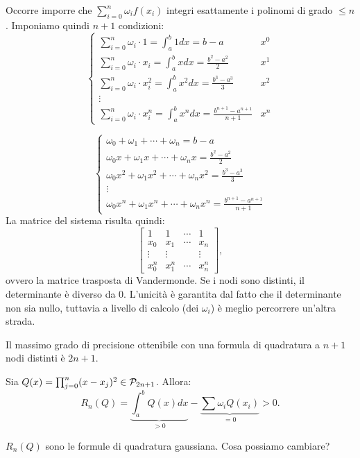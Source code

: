 \begin{dimo}
Occorre imporre che $ \sum_{i=0}^n\omega_if(x_i)$ integri esattamente i 
polinomi di grado $\leq n$. Imponiamo quindi $n+1$ condizioni:
\[\left\{
\begin{array}{lr}
\sum_{i=0}^n\omega_i\cdot 1 = \int_a^b 1dx = b-a& x^{0} \\
\sum_{i=0}^n\omega_i\cdot x_i = \int_a^b xdx = \frac{b^2-a^2}{2}& x^{1} \\
\sum_{i=0}^n\omega_i\cdot x_i^2 = \int_a^b x^2dx = \frac{b^3-a^3}{3}& x^{2} \\
\vdots \\
\sum_{i=0}^n\omega_i\cdot x_i^n = \int_a^b x^ndx = 
\frac{b^{n+1}-a^{n+1}}{n+1}& x^{n}
\end{array}\right.
\]

\[\left\{
\begin{array}{l}
\omega_0 + \omega_1 + \cdots + \omega_n = b-a \\
\omega_0x + \omega_1x + \cdots + \omega_nx = \frac{b^2-a^2}{2} \\
\omega_0x^2 + \omega_1x^2 + \cdots + \omega_nx^2 = \frac{b^3-a^3}{3}\\
\vdots \\
\omega_0x^n + \omega_1x^n + \cdots + \omega_nx^n = 
\frac{b^{n+1}-a^{n+1}}{n+1}
\end{array}\right.
\]
La matrice del sistema risulta quindi:
\[\left[
\begin{array}{cccc}
1 & 1 & \cdots & 1 \\
x_0 & x_1 & \cdots & x_n \\
\vdots & \vdots & & \vdots\\
x_0^n & x_1^n & \cdots & x_n^n
\end{array}\right],
\]
ovvero la matrice trasposta di Vandermonde. Se i nodi sono distinti, il
determinante è diverso da $0$. L'unicità è garantita dal fatto che il
determinante non sia nullo, tuttavia a livello di calcolo (dei $\omega_i$) è
meglio percorrere un'altra strada.
\end{dimo}

\begin{prop}
Il massimo grado di precisione ottenibile con una formula di quadratura a
$n+1$ nodi distinti è $2n +1$.
\end{prop}
\begin{dimo}
Sia $Q(x) = \prod_{j=0}^n(x-x_j)^2 \in \mathcal{P}_{2n+1}$. Allora:
\[R_n(Q) = \underbrace{\int_a^bQ(x)dx}_{ > 0} - 
\underbrace{\sum \omega_i Q(x_i)}_{=0} > 0.\]
\end{dimo}
$R_n(Q)$ sono le formule di quadratura gaussiana. Cosa possiamo cambiare?

